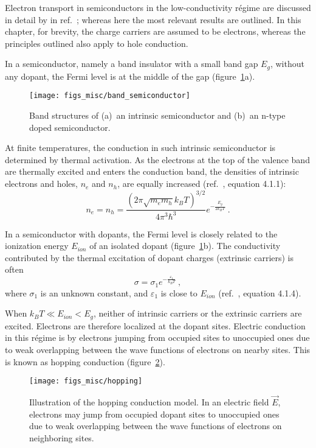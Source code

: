 Electron transport in semiconductors in the low-conductivity r\'egime are discussed in detail by \citeauthor{schklovskii_efros} in ref.~\cite{schklovskii_efros}; whereas here the most relevant results are outlined. In this chapter, for brevity, the charge carriers are assumed to be electrons, whereas the principles outlined also apply to hole conduction.

In a semiconductor, namely a band insulator with a small band gap $E_g$, without any dopant, the Fermi level is at the middle of the gap (figure~\ref{fig:band_semiconductor}a). %
\begin{figure}[ht]%
    \centering%
    \texttt{[image: figs\_misc/band\_semiconductor]}%
    \caption[Band structures of an intrinsic semiconductor and an n-type doped semiconductor]{\label{fig:band_semiconductor}Band structures of (a)~an intrinsic semiconductor and (b)~an n-type doped semiconductor.}%
\end{figure}%
%
At finite temperatures, the conduction in such intrinsic semiconductor is determined by thermal activation. As the electrons at the top of the valence band are thermally excited and enters the conduction band, the densities of intrinsic electrons and holes, $n_e$ and $n_h$, are equally increased (ref.~\cite{schklovskii_efros}, equation 4.1.1):%
\begin{equation}
    n_e = n_h = \frac{\left(2\pi\sqrt{m_e m_h}k_B T\right)^{3/2}}{4\pi^3\hbar^3}e^{-\frac{E_g}{2 k_B T}}~.
\end{equation}

In a semiconductor with dopants, the Fermi level is closely related to the ionization energy $E_{ion}$ of an isolated dopant (figure~\ref{fig:band_semiconductor}b). The conductivity contributed by the thermal excitation of dopant charges (extrinsic carriers) is often%
\begin{equation}
    \sigma = \sigma_1 e^{-\frac{\varepsilon_1}{k_B T}}~,\label{eq:activation}
\end{equation}%
where $\sigma_1$ is an unknown constant, and $\varepsilon_1$ is close to $E_{ion}$ (ref.~\cite{schklovskii_efros}, equation 4.1.4).

When $k_B T \ll E_{ion} < E_g$, neither of intrinsic carriers or the extrinsic carriers are excited. Electrons are therefore localized at the dopant sites. Electric conduction in this r\'egime is by electrons jumping from occupied sites to unoccupied ones due to weak overlapping between the wave functions of electrons on nearby sites. This is known as hopping conduction (figure~\ref{fig:hopping}).%
\begin{figure}[ht]%
    \centering%
    \texttt{[image: figs\_misc/hopping]}%
    \caption[Hopping conduction model]{\label{fig:hopping}Illustration of the hopping conduction model. In an electric field $\vec{E}$, electrons may jump from occupied dopant sites to unoccupied ones due to weak overlapping between the wave functions of electrons on neighboring sites.}%
\end{figure}%

